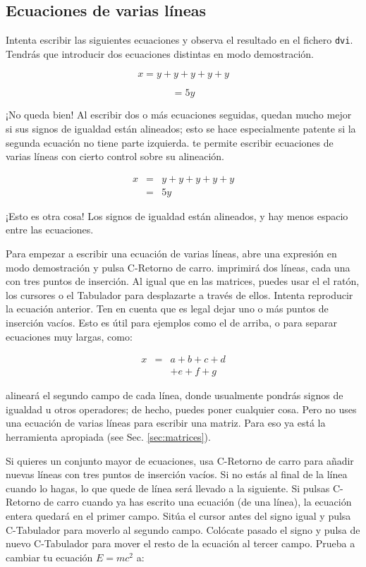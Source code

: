 \subsection{Ecuaciones de varias líneas}

\label{sec:multiline}Intenta escribir las siguientes ecuaciones y
observa el resultado en el fichero \texttt{dvi}. Tendrás que introducir
dos ecuaciones distintas en modo demostración.

\[
x=y+y+y+y+y\]


\[
=5y\]


¡No queda bien! Al escribir dos o más ecuaciones seguidas, quedan
mucho mejor si sus signos de igualdad están alineados; esto se hace
especialmente patente si la segunda ecuación no tiene parte izquierda.
\LyX{} te permite escribir ecuaciones de varias líneas con cierto
control sobre su alineación.

\begin{eqnarray*}
x & = & y+y+y+y+y\\
 & = & 5y\end{eqnarray*}


¡Esto es otra cosa! Los signos de igualdad están alineados, y hay
menos espacio entre las ecuaciones.

Para empezar a escribir una ecuación de varias líneas, abre una expresión
en modo demostración y pulsa \textsf{C-Retorno de carro}. \LyX{} imprimirá
dos líneas, cada una con tres puntos de inserción. Al igual que en
las matrices, puedes usar el el ratón, los cursores o el \textsf{Tabulador}
para desplazarte a través de ellos. Intenta reproducir la ecuación
anterior. Ten en cuenta que es legal dejar uno o más puntos de inserción
vacíos. Esto es útil para ejemplos como el de arriba, o para separar
ecuaciones muy largas, como:

\begin{eqnarray*}
x & = & a+b+c+d\\
 &  & +e+f+g\end{eqnarray*}


\LyX{} alineará el segundo campo de cada línea, donde usualmente pondrás
signos de igualdad u otros operadores; de hecho, puedes poner cualquier
cosa. Pero no uses una ecuación de varias líneas para escribir una
matriz. Para eso ya está la herramienta apropiada (see Sec. \ref{sec:matrices}).

Si quieres un conjunto mayor de ecuaciones, usa \textsf{C-Retorno
de carro} para añadir nuevas líneas con tres puntos de inserción vacíos.
Si no estás al final de la línea cuando lo hagas, lo que quede de
línea será llevado a la siguiente. Si pulsas \textsf{C-Retorno de
carro} cuando ya has escrito una ecuación (de una línea), la ecuación
entera quedará en el primer campo. Sitúa el cursor antes del signo
igual y pulsa \textsf{C-Tabulador} para moverlo al segundo campo.
Colócate pasado el signo y pulsa de nuevo \textsf{C-Tabulador} para
mover el resto de la ecuación al tercer campo. Prueba a cambiar tu
ecuación $E=mc^{2}$ a:

